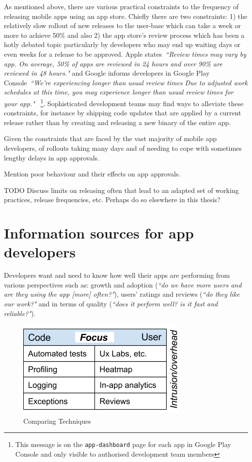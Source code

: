 As mentioned above, there are various practical constraints to the frequency of releasing mobile apps using an app store. Chiefly there are two constraints: 1) the relatively slow rollout of new releases to the user-base which can take a week or more to achieve 50\% and also 2) the app store's review process which has been a hotly debated topic particularly by developers who may end up waiting days or even weeks for a release to be approved. Apple states~\emph{``Review times may vary by app. On average, 50\% of apps are reviewed in 24 hours and over 90\% are reviewed in 48 hours."} and Google informs developers in Google Play Console~\emph{``We're experiencing longer than usual review times
Due to adjusted work schedules at this time, you may experience longer than usual review times for your app."} ~\footnote{This message is on the \texttt{app-dashboard} page for each app in Google Play Console and only visible to authorised development team members}. Sophisticated development teams may find ways to alleviate these constraints, for instance by shipping code updates that are applied by a current release rather than by creating and releasing a new binary of the entire app.

Given the constraints that are faced by the vast majority of mobile app developers, of rollouts taking many days and of needing to cope with sometimes lengthy delays in app approvals. 

Mention poor behaviour and their effects on app approvals.

TODO Discuss limits on releasing often that lead to an adapted set of working practices, release frequencies, etc. Perhaps do so elsewhere in this thesis?


\section{Information sources for app developers}
Developers want and need to know how well their apps are performing from various perspectives such as: growth and adoption (\emph{``do we have more users and are they using the app [more] often?"}), users' ratings and reviews (\emph{``do they like our work?"} and in terms of quality (\emph{``does it perform well? is it fast and reliable?"}). 

\begin{figure}[htbp!]
    \centering
    \includegraphics{images/ComparingTechniquesRHS.png}
    \caption{Comparing Techniques}
    \label{fig:comparing_techniques}
\end{figure}

